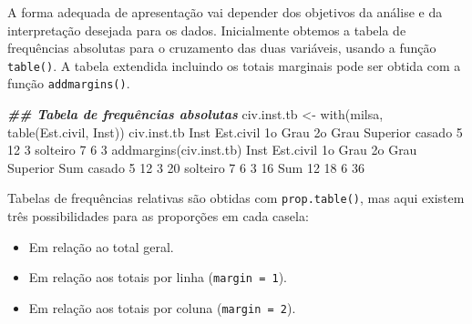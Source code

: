 \documentclass[
  10pt,
  a4paper]{book}
\newenvironment{Shaded}{\begin{snugshade}}{\end{snugshade}}
\newcommand{\DecValTok}[1]{\textcolor[rgb]{0.00,0.00,0.81}{#1}}
\newcommand{\DocumentationTok}[1]{\textcolor[rgb]{0.56,0.35,0.01}{\textbf{\textit{#1}}}}
\newcommand{\FunctionTok}[1]{\textcolor[rgb]{0.00,0.00,0.00}{#1}}
\newcommand{\NormalTok}[1]{#1}
\newcommand{\OtherTok}[1]{\textcolor[rgb]{0.56,0.35,0.01}{#1}}
\providecommand{\tightlist}{%
  \setlength{\itemsep}{0pt}\setlength{\parskip}{0pt}}
\begin{document}
A forma adequada de apresentação vai depender dos objetivos da análise e
da interpretação desejada para os dados. Inicialmente obtemos a tabela de
frequências absolutas para o cruzamento das duas variáveis, usando a
função \texttt{table()}. A tabela extendida incluindo os totais marginais pode
ser obtida com a função \texttt{addmargins()}.

\begin{Shaded}
\begin{Highlighting}[]
\DocumentationTok{\#\# Tabela de frequências absolutas}
\NormalTok{civ.inst.tb }\OtherTok{\textless{}{-}} \FunctionTok{with}\NormalTok{(milsa, }\FunctionTok{table}\NormalTok{(Est.civil, Inst))}
\NormalTok{civ.inst.tb}
\NormalTok{          Inst}
\NormalTok{Est.civil  1o Grau 2o Grau Superior}
\NormalTok{  casado         }\DecValTok{5}      \DecValTok{12}        \DecValTok{3}
\NormalTok{  solteiro       }\DecValTok{7}       \DecValTok{6}        \DecValTok{3}
\FunctionTok{addmargins}\NormalTok{(civ.inst.tb)}
\NormalTok{          Inst}
\NormalTok{Est.civil  1o Grau 2o Grau Superior Sum}
\NormalTok{  casado         }\DecValTok{5}      \DecValTok{12}        \DecValTok{3}  \DecValTok{20}
\NormalTok{  solteiro       }\DecValTok{7}       \DecValTok{6}        \DecValTok{3}  \DecValTok{16}
\NormalTok{  Sum           }\DecValTok{12}      \DecValTok{18}        \DecValTok{6}  \DecValTok{36}
\end{Highlighting}
\end{Shaded}

Tabelas de frequências relativas são obtidas com \texttt{prop.table()}, mas
aqui existem três possibilidades para as proporções em cada casela:

\begin{itemize}
\tightlist
\item
  Em relação ao total geral.
\item
  Em relação aos totais por linha (\texttt{margin\ =\ 1}).
\item
  Em relação aos totais por coluna (\texttt{margin\ =\ 2}).
\end{itemize}
\end{document}

